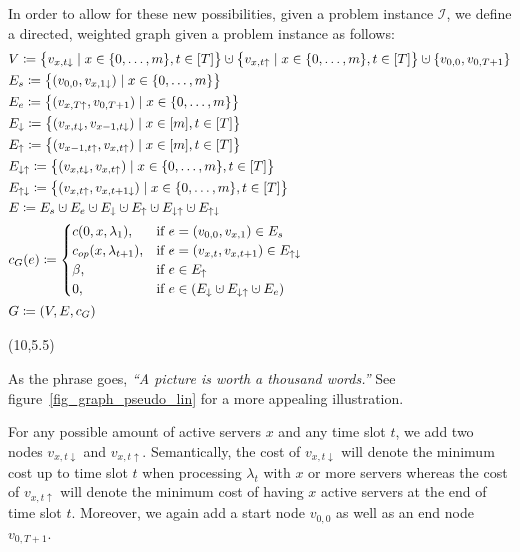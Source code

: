 \documentclass[hidelinks]{article}
\theoremstyle{plain}
\theoremstyle{definition}
\theoremstyle{rem}
\newcommand{\inp}{\mathcal{I}}
\newcommand{\costs}{c}
\newcommand{\opcosts}{c_{op}}
\newcommand{\fromto}[2]{\{#1,\ldots,#2\}}
\newcommand{\dotcup}{\mathbin{\mathaccent\cdot\cup}}
\begin{document}
In order to allow for these new possibilities, given a problem instance $\inp$, we define a directed, weighted graph given a problem instance as follows:
\begin{align*}
	&V\coloneqq\bigl\{v_{x,t\downarrow}\mid x\in\fromto{0}{m},t\in[T]\bigr\}\dotcup\bigl\{v_{x,t\uparrow}\mid x\in\fromto{0}{m},t\in[T]\bigr\}\dotcup\{v_{0,0},v_{0,T+1}\}\\
	&E_s\coloneqq\bigl\{(v_{0,0},v_{x,1\downarrow})\mid x\in\fromto{0}{m}\bigr\}\\
	&E_e\coloneqq\bigl\{(v_{x,T\uparrow},v_{0,T+1})\mid x\in\fromto{0}{m}\bigr\}\\
	&E_\downarrow\coloneqq\bigl\{(v_{x,t\downarrow},v_{x-1,t\downarrow})\mid x\in[m],t\in[T]\bigr\}\\
	&E_\uparrow\coloneqq\bigl\{(v_{x-1,t\uparrow},v_{x,t\uparrow})\mid x\in[m],t\in[T]\bigr\}\\
	&E_{\downarrow\uparrow}\coloneqq\bigl\{(v_{x,t\downarrow},v_{x,t\uparrow})\mid x\in\fromto{0}{m},t\in[T]\bigr\}\\
	&E_{\uparrow\downarrow}\coloneqq\bigl\{(v_{x,t\uparrow},v_{x,t+1\downarrow})\mid x\in\fromto{0}{m},t\in[T]\bigr\}\\
	&E\coloneqq E_s\dotcup E_e\dotcup E_\downarrow\dotcup E_\uparrow\dotcup E_{\downarrow\uparrow}\dotcup E_{\uparrow\downarrow}\\
	&c_G(e)\coloneqq
	\begin{cases}
		\costs(0,x,\lambda_1), & \text{if $e=(v_{0,0},v_{x,1})\in E_s$}\\
		\opcosts(x,\lambda_{t+1}), & \text{if $e=(v_{x,t},v_{x,t+1})\in E_{\uparrow\downarrow}$}\\
		\beta, & \text{if $e\in E_\uparrow$}\\
		0, & \text{if $e\in(E_\downarrow\dotcup E_{\downarrow\uparrow}\dotcup E_e)$}
	\end{cases}\\
	&G\coloneqq(V,E,c_G)
\end{align*}
\begin{textblock}{3}(10,5.5)
\begin{framed}
As the phrase goes, \textit{``A picture is worth a thousand words.''} See figure~\ref{fig_graph_pseudo_lin} for a more appealing illustration.%
\end{framed}
\end{textblock}
For any possible amount of active servers $x$ and any time slot $t$, we add two nodes $v_{x,t\downarrow}$ and $v_{x,t\uparrow}$. Semantically, the cost of $v_{x,t\downarrow}$ will denote the minimum cost up to time slot $t$ when processing $\lambda_t$ with $x$ or more servers whereas the cost of $v_{x,t\uparrow}$ will denote the minimum cost of having $x$ active servers at the end of time slot $t$. Moreover, we again add a start node $v_{0,0}$ as well as an end node $v_{0,T+1}$. 
\end{document}
